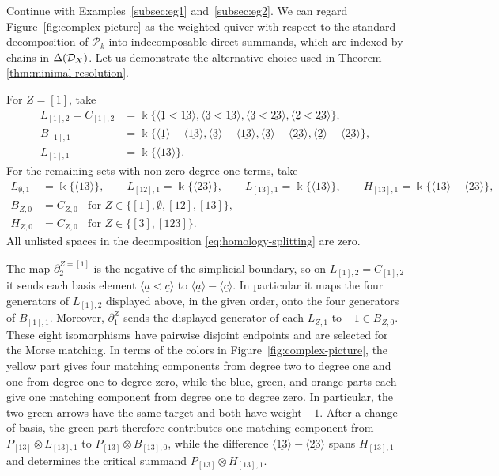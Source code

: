 \documentclass[a4paper,leqno]{amsart}
\begin{document}
\begin{eg}\label{eg:morse-matching-change-of-basis}
Continue with Examples~\ref{subsec:eg1} and~\ref{subsec:eg2}. We can regard Figure~\ref{fig:complex-picture} as the weighted quiver with respect to the standard decomposition of $\mathcal{P}_k$ into indecomposable direct summands, which are indexed by chains in $\Delta(\mathcal D_X)$. Let us demonstrate the alternative choice used in Theorem \ref{thm:minimal-resolution}.

For $Z=[1]$, take
\begin{align*}
 L_{[1],2}=C_{[1],2}
  &=\Bbbk\{
  \langle\underline{1}<\underline{13}\rangle,
  \langle\underline{3}<\underline{13}\rangle,
  \langle\underline{3}<\underline{23}\rangle,
  \langle\underline{2}<\underline{23}\rangle\},\\
 B_{[1],1}&=\Bbbk\{
  \langle\underline{1}\rangle-\langle\underline{13}\rangle,
  \langle\underline{3}\rangle-\langle\underline{13}\rangle,
  \langle\underline{3}\rangle-\langle\underline{23}\rangle,
  \langle\underline{2}\rangle-\langle\underline{23}\rangle\},\\
 L_{[1],1}&=\Bbbk\{\langle\underline{13}\rangle\}.
\end{align*}
For the remaining sets with non-zero degree-one terms, take
\begin{align*}
 L_{\emptyset,1}&=\Bbbk\{\langle\underline{13}\rangle\}, \qquad L_{[12],1}=\Bbbk\{\langle\underline{23}\rangle\}, \qquad 
 L_{[13],1}=\Bbbk\{\langle\underline{13}\rangle\}, \qquad 
 H_{[13],1}=
 \Bbbk\{\langle\underline{13}\rangle-
              \langle\underline{23}\rangle\},\\
 B_{Z,0}&=C_{Z,0} \;\;\text{ for } Z\in\{[1],\emptyset,[12],[13]\},&&\\
 H_{Z,0}&=C_{Z,0} \;\;\text{ for } Z\in\{[3],[123]\}.
 &&
\end{align*}
All unlisted spaces in the decomposition \eqref{eq:homology-splitting} are zero.

The map $\partial^{Z=[1]}_2$ is the negative of the simplicial boundary, so on $L_{[1],2}=C_{[1],2}$ it sends each basis element $\langle\underline a<\underline c\rangle$ to $\langle\underline a\rangle-\langle\underline c\rangle$.  In particular it maps the four generators of $L_{[1],2}$ displayed above, in the given order, onto the four generators of $B_{[1],1}$.
Moreover, $\partial^Z_1$ sends the displayed generator of each $L_{Z,1}$ to $-1\in B_{Z,0}$.  These eight isomorphisms have pairwise disjoint endpoints and are selected for the Morse matching.  In terms of the colors in Figure~\ref{fig:complex-picture}, the yellow part gives four matching components from degree two to degree one and one from degree one to degree zero, while the blue, green, and orange parts each give one matching component from degree one to degree zero. In particular, the two green arrows have the same target and both have weight $-1$. After a change of basis, the green part therefore contributes one matching component from $P_{[13]}\otimes L_{[13],1}$ to $P_{[13]}\otimes B_{[13],0}$,  while the difference $\langle\underline{13}\rangle-\langle\underline{23}\rangle$ spans $H_{[13],1}$ and determines the critical summand $P_{[13]}\otimes H_{[13],1}$.


\end{eg}
\end{document}
